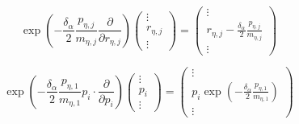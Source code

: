 \documentclass[11pt,a4paper]{article}
\begin{document}
	\[
	\exp \left( { - \frac{{{\delta _\alpha }}}{2}\frac{{{p_{\eta ,j}}}}{{{m_{\eta ,j}}}}\frac{\partial }{{\partial {r_{\eta ,j}}}}} \right)\left( {\begin{array}{*{20}{c}}
		\vdots  \\ 
		{{r_{\eta ,j}}} \\ 
		\vdots  
		\end{array}} \right) = \left( {\begin{array}{*{20}{c}}
		\vdots  \\ 
		{{r_{\eta ,j}} - \frac{{{\delta _\alpha }}}{2}\frac{{{p_{\eta ,j}}}}{{{m_{\eta ,j}}}}} \\ 
		\vdots  
		\end{array}} \right)
	\]
	
	\[
	\exp \left( { - \frac{{{\delta _\alpha }}}{2}\frac{{{p_{\eta ,1}}}}{{{m_{\eta ,1}}}}{p_i} \cdot \frac{\partial }{{\partial {p_i}}}} \right)\left( {\begin{array}{*{20}{c}}
		\vdots  \\ 
		{{p_i}} \\ 
		\vdots  
		\end{array}} \right) = \left( {\begin{array}{*{20}{c}}
		\vdots  \\ 
		{{p_i}\exp \left( { - \frac{{{\delta _\alpha }}}{2}\frac{{{p_{\eta ,1}}}}{{{m_{\eta ,1}}}}} \right)} \\ 
		\vdots  
		\end{array}} \right)
	\]
	
	
	
	
\end{document}
